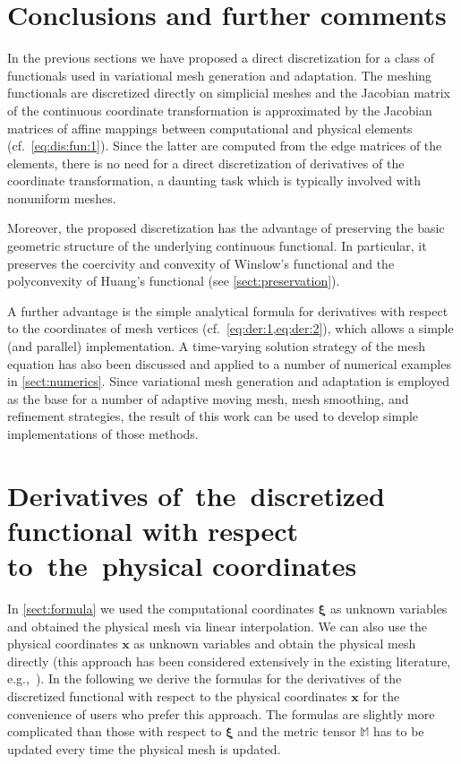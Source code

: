 \documentclass[american]{scrartcl}
\providecommand{\V}[1]{\boldsymbol{#1}}
\providecommand{\M}{\mathbb{M}}
\theoremstyle{remark}
\begin{document}
\section{Conclusions and further comments}
\label{sect:conclusion}

In the previous sections we have proposed a direct discretization for a class of functionals used in variational mesh generation and adaptation.
The meshing functionals are discretized directly on simplicial meshes and the Jacobian matrix of the continuous coordinate transformation is approximated by the Jacobian matrices of affine mappings between computational and physical elements (cf.~\cref{eq:dis:fun:1}).
Since the latter are computed from the edge matrices of the elements, there is no need for a direct discretization of derivatives of the coordinate transformation, a daunting task which is typically involved with nonuniform meshes.

Moreover, the proposed discretization has the advantage of preserving the basic geometric structure of the underlying continuous functional.
In particular, it preserves the coercivity and convexity of Winslow's functional and the polyconvexity of Huang's functional (see \cref{sect:preservation}).

A further advantage is the simple analytical formula for derivatives with respect to the coordinates of mesh vertices (cf.~\cref{eq:der:1,eq:der:2}), which allows a simple (and parallel) implementation.
A time-varying solution strategy of the mesh equation has also been discussed and applied to a number of numerical examples in \cref{sect:numerics}.
Since variational mesh generation and adaptation is employed as the base for a number of adaptive moving mesh, mesh smoothing, and refinement strategies, the result of this work can be used to develop simple implementations of those methods.

\appendix
\section{Derivatives of~the~discretized functional with respect to~the~physical coordinates}
\label{sect:x:der}

In \cref{sect:formula} we used the computational coordinates $\V{\xi}$ as unknown variables and obtained the physical mesh via linear interpolation.
We can also use the physical coordinates $\V{x}$ as unknown variables and obtain the physical mesh directly (this approach has been considered extensively in the existing literature, e.g.,~\cite{HR11}).
In the following we derive the formulas for the derivatives of the discretized functional with respect to the physical coordinates $\V{x}$ for the convenience of users who prefer this approach.
The formulas are slightly more complicated than those with respect to $\V{\xi}$ and the metric tensor $\M$ has to be updated every time the physical mesh is updated.
\end{document}
